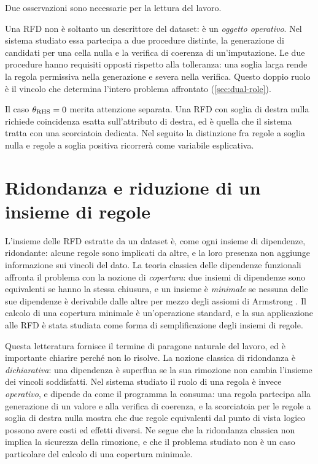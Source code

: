 Due osservazioni sono necessarie per la lettura del lavoro.

\begin{observation}\label{obs:dual}
Una RFD non è soltanto un descrittore del dataset: è un \emph{oggetto operativo}. Nel sistema
studiato essa partecipa a due procedure distinte, la generazione di candidati per una cella nulla
e la verifica di coerenza di un'imputazione. Le due procedure hanno requisiti opposti rispetto
alla tolleranza: una soglia larga rende la regola permissiva nella generazione e severa nella
verifica. Questo doppio ruolo è il vincolo che determina l'intero problema affrontato
(\autoref{sec:dual-role}).
\end{observation}

\begin{observation}
Il caso $\theta_{\mathrm{RHS}} = 0$ merita attenzione separata. Una RFD con soglia di destra nulla
richiede coincidenza esatta sull'attributo di destra, ed è quella che il sistema tratta con una
scorciatoia dedicata. Nel seguito la distinzione fra regole a soglia nulla e regole a soglia
positiva ricorrerà come variabile esplicativa.
\end{observation}

\section{Ridondanza e riduzione di un insieme di regole}\label{sec:rule-reduction}

L'insieme delle RFD estratte da un dataset è, come ogni insieme di dipendenze, ridondante: alcune
regole sono implicati da altre, e la loro presenza non aggiunge informazione sui vincoli del dato.
La teoria classica delle dipendenze funzionali affronta il problema con la nozione di
\emph{copertura}: due insiemi di dipendenze sono equivalenti se hanno la stessa chiusura, e un
insieme è \emph{minimale} se nessuna delle sue dipendenze è derivabile dalle altre per mezzo degli
assiomi di Armstrong \cite{armstrong1974dependency, maier1983theory}. Il calcolo di una copertura
minimale è un'operazione standard, e la sua applicazione alle RFD è stata studiata come forma di
semplificazione degli insiemi di regole.

Questa letteratura fornisce il termine di paragone naturale del lavoro, ed è importante
chiarire perché non lo risolve. La nozione classica di ridondanza è \emph{dichiarativa}: una
dipendenza è superflua se la sua rimozione non cambia l'insieme dei vincoli soddisfatti. Nel
sistema studiato il ruolo di una regola è invece \emph{operativo}, e dipende da come il programma
la consuma: una regola partecipa alla generazione di un valore e alla verifica di coerenza, e la
scorciatoia per le regole a soglia di destra nulla mostra che due regole equivalenti dal punto di
vista logico possono avere costi ed effetti diversi. Ne segue che la ridondanza classica non
implica la sicurezza della rimozione, e che il problema studiato non è un caso particolare del
calcolo di una copertura minimale.

